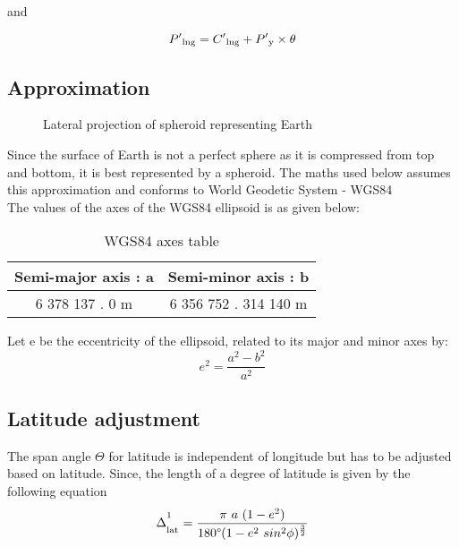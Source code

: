 \documentclass[conference]{IEEEtran}
\begin{document}
and

\begin{equation}P'\textsubscript{lng} = C'\textsubscript{lng} + P'\textsubscript{y} \times \theta\end{equation}

\subsection{Approximation}
\begin{figure}[htbp]
\centerline{}
\caption{Lateral projection of spheroid representing Earth}
\label{Spheroid}
\end{figure}
Since the surface of Earth is not a perfect sphere as it is compressed from top and bottom, it is best represented by a spheroid.
The maths used below assumes this approximation and conforms to World Geodetic System - WGS84\cite{b1}\\
The values of the axes of the WGS84 ellipsoid is as given below:
\begin{table}[h!]
\caption{WGS84 axes table}
\begin{center}
\bgroup
\def\arraystretch{1.4}%
\begin{tabular}{c|c}
\textbf{Semi-major axis : a} & \textbf{Semi-minor axis : b} \\
\hline
6 378 137 . 0 m & 6 356 752 . 314 140 m\\
\end{tabular}
\egroup
\end{center} \end{table}

Let e be the eccentricity of the ellipsoid, related to its major and minor axes by:
\begin{equation}e^2 =  \frac{a^2-b^2}{a^2}\end{equation}

\subsection{Latitude adjustment}
The span angle $\Theta$ for latitude is independent of longitude but has to be adjusted based on latitude.
Since, the length of a degree of latitude is given by the following equation\cite{b2}
\begin{equation}\Delta^\textsuperscript{1}_\textsubscript{lat}=\frac{\pi \ a \ (1 - e^2)} {180\degree (1 - e\textsuperscript{2} \ sin\textsuperscript{2}\phi)^\frac{3}{2}}\end{equation}
\end{document}
